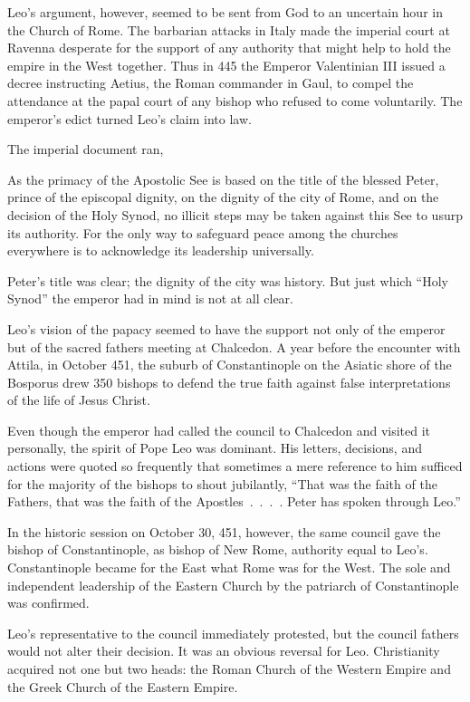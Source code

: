 Leo’s argument, however, seemed to be sent from God to an uncertain hour in the Church of Rome. The
barbarian attacks in Italy made the imperial court at Ravenna desperate for the support of any
authority that might help to hold the empire in the West together. Thus in 445 the Emperor
Valentinian III issued a decree instructing Aetius, the Roman commander in Gaul, to compel the
attendance at the papal court of any bishop who refused to come voluntarily. The emperor’s edict
turned Leo’s claim into law.

The imperial document ran,

\begin{blockquote}
As the primacy of the Apostolic See is based on the title of the blessed Peter, prince of the
episcopal dignity, on the dignity of the city of Rome, and on the decision of the Holy Synod, no
illicit steps may be taken against this See to usurp its authority. For the only way to safeguard
peace among the churches everywhere is to acknowledge its leadership universally.
\end{blockquote}

Peter’s title was clear; the dignity of the city was history. But just which “Holy Synod” the
emperor had in mind is not at all clear.

Leo’s vision of the papacy seemed to have the support not only of the emperor but of the sacred
fathers meeting at Chalcedon. A year before the encounter with Attila, in October 451, the suburb of
Constantinople on the Asiatic shore of the Bosporus drew 350 bishops to defend the true faith
against false interpretations of the life of Jesus Christ.

Even though the emperor had called the council to Chalcedon and visited it personally, the spirit of
Pope Leo was dominant. His letters, decisions, and actions were quoted so frequently that sometimes
a mere reference to him sufficed for the majority of the bishops to shout jubilantly, “That was the
faith of the Fathers, that was the faith of the Apostles~.~.~.~. Peter has spoken through Leo.”

In the historic session on October 30, 451, however, the same council gave the bishop of
Constantinople, as bishop of New Rome, authority equal to Leo’s. Constantinople became for the East
what Rome was for the West. The sole and independent leadership of the Eastern Church by the
patriarch of Constantinople was confirmed.

Leo’s representative to the council immediately protested, but the council fathers would not alter
their decision. It was an obvious reversal for Leo. Christianity acquired not one but two heads: the
Roman Church of the Western Empire and the Greek Church of the Eastern Empire.

